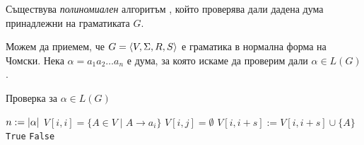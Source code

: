 \begin{thm}
  Съществува {\em полиномиален} алгоритъм , който проверява дали дадена дума принадлежни на граматиката $G$.
\end{thm}
Можем да приемем, че $G = \langle{V,\Sigma,R,S}\rangle$ е граматика в нормална форма на Чомски.
Нека $\alpha = a_1a_2\dots a_n$ е дума, за която искаме да проверим дали $\alpha \in L(G)$.
\begin{algorithm}[H]
  \caption{Проверка за $\alpha \in L(G)$}
  \label{alg:belongs-to-grammar}
  \begin{algorithmic}[1]
    \State $n := \lvert{\alpha}\rvert$ 
    \State $V[i,i] = \{A \in V \mid A\rightarrow a_i\}$
    \EndFor
    \State $V[i,j] = \emptyset$
    \EndFor      
    \ForAll{$s \in [1, n)$} 
    \ForAll{$k \in [i, i + s)$}
    \State $V[i,i+s] := V[i,i+s] \cup \{A\}$
    \EndIf
    \EndFor
    \EndFor
    \EndFor
    \State \Return \texttt{True}
    \Else
    \State \Return \texttt{False}
    \EndIf
  \end{algorithmic}
\end{algorithm}

